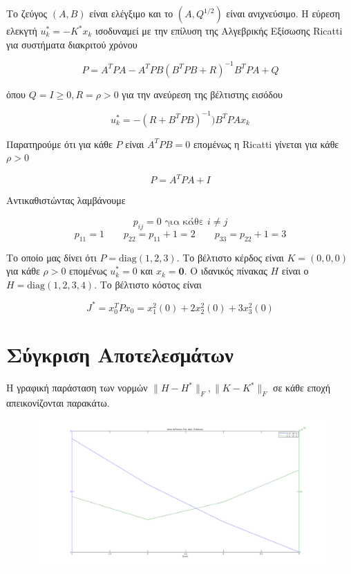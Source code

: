 \documentclass[a4paper,oneside,12pt]{article}
\renewcommand{\vec}[1]{\ensuremath{\mathbf {  #1 }}}
\begin{document}
Το ζεύγος $(A, B)$ είναι ελέγξιμο και το $(A, Q^{1/2})$ είναι ανιχνεύσιμο. Η εύρεση ελεκγτή $u_k^* = -K^*  x_k$ ισοδυναμεί με την επίλυση της Αλγεβρικής Εξίσωσης Ricatti για συστήματα διακριτού χρόνου

$$P = A^T P A - A^T P B (B^T P B + R)^{-1} B^T P A + Q$$

όπου $Q = I \ge 0, R = \rho > 0$ για την ανεύρεση της βέλτιστης εισόδου 

$$u^*_k = - (R + B^TPB)^{-1})B^T P A x_k$$

Παρατηρούμε ότι για κάθε $P$ είναι $A^TPB = 0$ επομένως η Ricatti γίνεται για κάθε $\rho > 0$

$$P = A^TPA + I$$ 

Αντικαθιστώντας λαμβάνουμε 

$$p_{ij} = 0  \text{ για κάθε } i \neq j$$
$$p_{11} = 1 \qquad p_{22} = p_{11} + 1 = 2 \qquad p_{33} = p_{22} + 1 = 3$$

Το οποίο μας δίνει ότι $P = \mathrm{diag} (1,2,3)$. Το βέλτιστο κέρδος είναι $K = (0, 0, 0)$ για κάθε $\rho > 0$ επομένως $u^*_k = 0$ και $x_k = \vec 0$. Ο ιδανικός πίνακας $H$ είναι ο $H = \mathrm {diag} (1,2,3,4)$. Το βέλτιστο κόστος είναι 

$$J^* = x_0^T P x_0 =  x_1^2 (0) + 2 x_2^2 (0) + 3 x_3^2 (0)$$


\section{Σύγκριση Αποτελεσμάτων}

Η γραφική παράσταση των νορμών $\| H - H^* \|_F, \| K - K^* \|_F$ σε κάθε εποχή απεικονίζονται παρακάτω.


\begin{figure}[H]
\centering
\includegraphics[scale=0.35]{norms.png}
\label{}
\end{figure}
\end{document}
